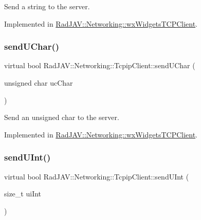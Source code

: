 Send a string to the server. 



Implemented in \mbox{\hyperlink{class_rad_j_a_v_1_1_networking_1_1wx_widgets_t_c_p_client_a2282375d71da7b7d38ef06a977e46827}{Rad\+J\+A\+V\+::\+Networking\+::wx\+Widgets\+T\+C\+P\+Client}}.

\mbox{\label{class_rad_j_a_v_1_1_networking_1_1_tcpip_client_a27e9adfc9d218a82cca52bdbe50c8ebf}} 
\subsubsection{\texorpdfstring{send\+U\+Char()}{sendUChar()}}
{\footnotesize\ttfamily virtual bool Rad\+J\+A\+V\+::\+Networking\+::\+Tcpip\+Client\+::send\+U\+Char (\begin{DoxyParamCaption}\item[{unsigned char}]{uc\+Char }\end{DoxyParamCaption})\hspace{0.3cm}{\ttfamily [pure virtual]}}



Send an unsigned char to the server. 



Implemented in \mbox{\hyperlink{class_rad_j_a_v_1_1_networking_1_1wx_widgets_t_c_p_client_ae50f5c377cd8116159f7afa5e7f0bbd5}{Rad\+J\+A\+V\+::\+Networking\+::wx\+Widgets\+T\+C\+P\+Client}}.

\mbox{\label{class_rad_j_a_v_1_1_networking_1_1_tcpip_client_a2d318570f9e5e1c08c64c34a4b0e424b}} 
\subsubsection{\texorpdfstring{send\+U\+Int()}{sendUInt()}}
{\footnotesize\ttfamily virtual bool Rad\+J\+A\+V\+::\+Networking\+::\+Tcpip\+Client\+::send\+U\+Int (\begin{DoxyParamCaption}\item[{size\+\_\+t}]{ui\+Int }\end{DoxyParamCaption})\hspace{0.3cm}{\ttfamily [pure virtual]}}



